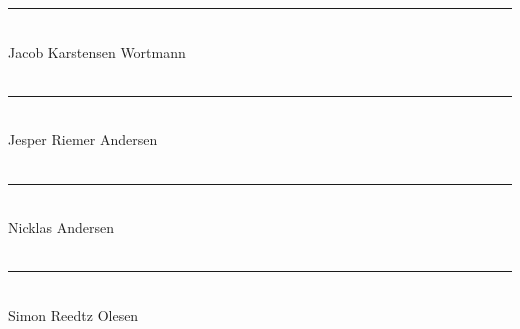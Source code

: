 \setcounter{page}{7}
\thispagestyle{empty}

\noindent\rule{8cm}{0.03cm}\\
Jacob Karstensen Wortmann\\\\

\noindent\rule{8cm}{0.03cm}\\ 
Jesper Riemer Andersen\\ \\

\noindent\rule{8cm}{0.03cm}\\
Nicklas Andersen\\\\

\noindent\rule{8cm}{0.03cm}\\
Simon Reedtz Olesen\\\\
